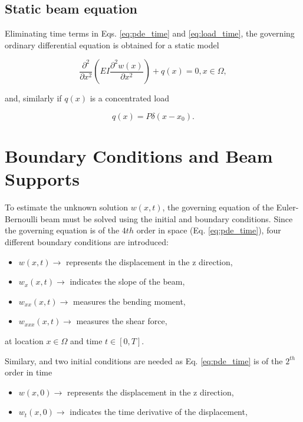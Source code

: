 \subsection{Static beam equation}

Eliminating time terms in Eqs. \ref{eq:pde_time} and \ref{eq:load_time}, the governing ordinary differential equation
is obtained for a static model

\begin{equation}
    \label{eq:ode_space}
    \frac{\partial^{2}}{\partial x^{2}}\left(E I \frac{\partial^{2} w(x)}{\partial x^{2}}\right) + q(x) = 0, x \in \Omega,
\end{equation}

\noindent and, similarly if $q(x)$ is a concentrated load

\begin{equation}
    q(x) = P \delta\left(x-x_{0}\right).
\end{equation}


\section{Boundary Conditions and Beam Supports}

To estimate the unknown solution $w(x,t)$, 
the governing equation of the Euler-Bernoulli beam 
must be solved using the initial and boundary conditions. Since the governing equation is of the $4th$ order in space (Eq. \ref{eq:pde_time}), 
four different boundary conditions are introduced:
\begin{itemize}
    \item $w(x,t) \rightarrow$ represents the displacement in the z direction,
    \item $w_{x}(x,t) \rightarrow$ indicates the slope of the beam,
    \item $w_{xx}(x,t) \rightarrow$ measures the bending moment,
    \item $w_{xxx}(x,t) \rightarrow$ measures the shear force, 
\end{itemize}

\noindent at location $x \in \Omega$ and time $t \in [0,T]$. 

Similary, and two initial conditions are needed as Eq. \ref{eq:pde_time} is of the $2^{th}$ order in time
\begin{itemize}
    \item $w(x,0) \rightarrow$ represents the displacement in the z direction,
    \item $w_{t}(x,0) \rightarrow$  indicates the time derivative of the displacement,
\end{itemize}

